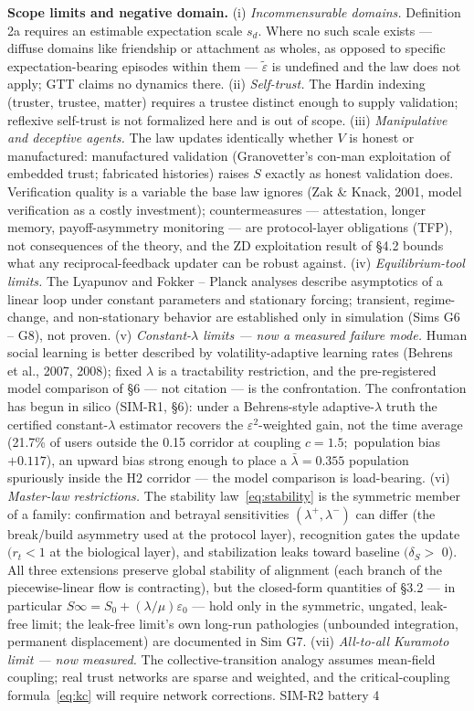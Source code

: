 \documentclass[11pt,twocolumn]{article}
\theoremstyle{gttdef}
\theoremstyle{gttplain}
\begin{document}
\textbf{Scope limits and negative domain.} (i) \emph{Incommensurable domains.} Definition 2a requires an estimable expectation scale $s_d.$ Where no such scale exists --- diffuse domains like friendship or attachment as wholes, as opposed to specific expectation-bearing episodes within them --- $\tilde{\varepsilon}$ is undefined and the law does not apply; GTT claims no dynamics there. (ii) \emph{Self-trust.} The Hardin indexing (truster, trustee, matter) requires a trustee distinct enough to supply validation; reflexive self-trust is not formalized here and is out of scope. (iii) \emph{Manipulative and deceptive agents.} The law updates identically whether $V$ is honest or manufactured: manufactured validation (Granovetter's con-man exploitation of embedded trust; fabricated histories) raises $S$ exactly as honest validation does. Verification quality is a variable the base law ignores (Zak \& Knack, 2001, model verification as a costly investment); countermeasures --- attestation, longer memory, payoff-asymmetry monitoring --- are protocol-layer obligations (TFP), not consequences of the theory, and the ZD exploitation result of \S{}4.2 bounds what any reciprocal-feedback updater can be robust against. (iv) \emph{Equilibrium-tool limits.} The Lyapunov and Fokker -- Planck analyses describe asymptotics of a linear loop under constant parameters and stationary forcing; transient, regime-change, and non-stationary behavior are established only in simulation (Sims G6 -- G8), not proven. (v) \emph{Constant-$\lambda$ limits --- now a measured failure mode.} Human social learning is better described by volatility-adaptive learning rates (Behrens et al., 2007, 2008); fixed $\lambda$ is a tractability restriction, and the pre-registered model comparison of \S{}6 --- not citation --- is the confrontation. The confrontation has begun in silico (SIM-R1, \S{}6): under a Behrens-style adaptive-$\lambda$ truth the certified constant-$\lambda$ estimator recovers the $\varepsilon^{2}$-weighted gain, not the time average (21.7\% of users outside the 0.15 corridor at coupling $c = 1.5;$ population bias $+0.117$), an upward bias strong enough to place a $\bar{\lambda} = 0.355$ population spuriously inside the H2 corridor --- the model comparison is load-bearing. (vi) \emph{Master-law restrictions.} The stability law~\eqref{eq:stability} is the symmetric member of a family: confirmation and betrayal sensitivities $(\lambda^{+}, \lambda^{-})$ can differ (the break/build asymmetry used at the protocol layer), recognition gates the update $(r_t < 1$ at the biological layer), and stabilization leaks toward baseline $(\delta_S >$ 0). All three extensions preserve global stability of alignment (each branch of the piecewise-linear flow is contracting), but the closed-form quantities of \S{}3.2 --- in particular $S\infty = S_{0} + (\lambda/\mu)\varepsilon_{0}$ --- hold only in the symmetric, ungated, leak-free limit; the leak-free limit's own long-run pathologies (unbounded integration, permanent displacement) are documented in Sim G7. (vii) \emph{All-to-all Kuramoto limit --- now measured.} The collective-transition analogy assumes mean-field coupling; real trust networks are sparse and weighted, and the critical-coupling formula~\eqref{eq:kc} will require network corrections. SIM-R2 battery 4 
\end{document}
